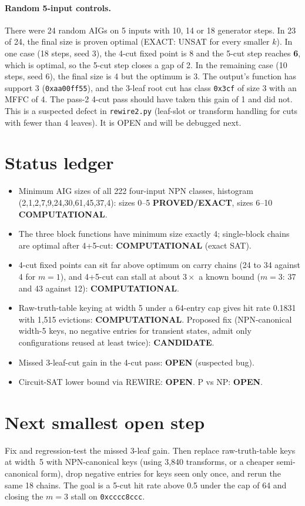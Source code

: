 \documentclass[11pt]{article}
\begin{document}
\paragraph{Random 5-input controls.} There were 24 random AIGs on 5 inputs with 10, 14 or 18 generator steps. In 23 of 24, the final size is proven optimal (EXACT: UNSAT for every smaller $k$). In one case (18 steps, seed 3), the 4-cut fixed point is 8 and the 5-cut step reaches \textbf{6}, which is optimal, so the 5-cut step closes a gap of 2. In the remaining case (10 steps, seed 6), the final size is 4 but the optimum is 3. The output's function has support 3 (\texttt{0xaa00ff55}), and the 3-leaf root cut has class \texttt{0x3cf} of size 3 with an MFFC of 4. The pass-2 4-cut pass should have taken this gain of 1 and did not. This is a suspected defect in \texttt{rewire2.py} (leaf-slot or transform handling for cuts with fewer than 4 leaves). It is OPEN and will be debugged next.

\section{Status ledger}
\begin{itemize}
\item Minimum AIG sizes of all 222 four-input NPN classes, histogram (2,1,2,7,9,24,30,61,45,37,4): sizes 0--5 \textbf{PROVED/EXACT}, sizes 6--10 \textbf{COMPUTATIONAL}.
\item The three block functions have minimum size exactly 4; single-block chains are optimal after 4+5-cut: \textbf{COMPUTATIONAL} (exact SAT).
\item 4-cut fixed points can sit far above optimum on carry chains (24 to 34 against 4 for $m=1$), and 4+5-cut can stall at about $3\times$ a known bound ($m=3$: 37 and 43 against 12): \textbf{COMPUTATIONAL}.
\item Raw-truth-table keying at width 5 under a 64-entry cap gives hit rate 0.1831 with 1{,}515 evictions: \textbf{COMPUTATIONAL}. Proposed fix (NPN-canonical width-5 keys, no negative entries for transient states, admit only configurations reused at least twice): \textbf{CANDIDATE}.
\item Missed 3-leaf-cut gain in the 4-cut pass: \textbf{OPEN} (suspected bug).
\item Circuit-SAT lower bound via REWIRE: \textbf{OPEN}. P vs NP: \textbf{OPEN}.
\end{itemize}

\section{Next smallest open step}
Fix and regression-test the missed 3-leaf gain. Then replace raw-truth-table keys at width~5 with NPN-canonical keys (using 3{,}840 transforms, or a cheaper semi-canonical form), drop negative entries for keys seen only once, and rerun the same 18 chains. The goal is a 5-cut hit rate above 0.5 under the cap of 64 and closing the $m=3$ stall on \texttt{0xcccc8ccc}.

\end{document}
